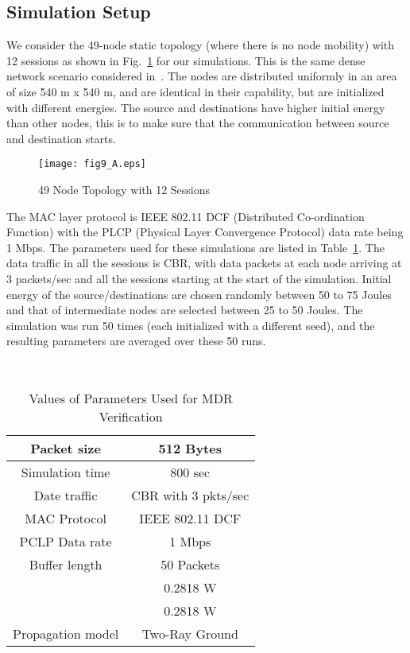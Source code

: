 \subsection{Simulation Setup}
\label{setup-mdr}
We consider the 49-node static topology (where there is no node mobility) with 12 sessions as shown in Fig.~\ref{fig57} for our simulations. This is the same dense network scenario considered in~\cite{mdr}. The nodes are distributed uniformly in an area of size 540 m x 540 m, and are identical in their capability, but are initialized with different energies. The source and destinations have higher initial energy than other nodes, this is to make sure that the communication between source and destination starts.

\begin{figure}[htbp]
	\centering
	\texttt{[image: fig9\_A.eps]}
	\caption{49 Node Topology with 12 Sessions}
	\label{fig57}
\end{figure}

The MAC layer protocol is IEEE 802.11 DCF (Distributed Co-ordination Function) with the PLCP (Physical Layer Convergence Protocol)  data rate being 1 Mbps. The parameters used for these simulations are listed in Table~\ref{tab54}. The data traffic in all the sessions is CBR, with data packets at each node arriving at 3 packets/sec and all the sessions starting at the start of the simulation. Initial energy of the source/destinations are chosen randomly between 50 to 75 Joules and that of intermediate nodes are selected between 25 to 50 Joules. The simulation was run 50 times (each initialized with a different seed), and the resulting parameters are averaged over these 50 runs.

\begin{table}[htbp]
\centering
  \caption{Values of Parameters Used for MDR Verification}
  \hfill \\	
  \begin{tabular}{|c|c|}
  \hline
  Packet size & 512 Bytes \\
  \hline
  Simulation time & 800 sec \\
  \hline
  Date traffic & CBR with 3 pkts/sec\\
  \hline
  MAC Protocol & IEEE 802.11 DCF \\
  \hline
  PCLP Data rate & 1 Mbps \\
  \hline
  Buffer length & 50 Packets \\
  \hline
   & 0.2818 W \\
  \hline
   & 0.2818 W \\
  \hline
  Propagation model & Two-Ray Ground \\
  \hline
  \end{tabular}
  \label{tab54}
\end{table}

